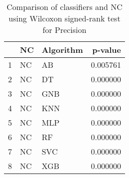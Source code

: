 \begin{table}
\footnotesize
\caption{Comparison of classifiers and NC using Wilcoxon signed-rank test for Precision}
\label{tab:NC wilcoxon Precision comparison}
\begin{tabular}{lllr}
\hline
 & NC & Algorithm & p-value \\
\hline
1 & NC & AB & 0.005761 \\
2 & NC & DT & 0.000000 \\
3 & NC & GNB & 0.000000 \\
4 & NC & KNN & 0.000000 \\
5 & NC & MLP & 0.000000 \\
6 & NC & RF & 0.000000 \\
7 & NC & SVC & 0.000000 \\
8 & NC & XGB & 0.000000 \\
\hline
\end{tabular}
\end{table}
